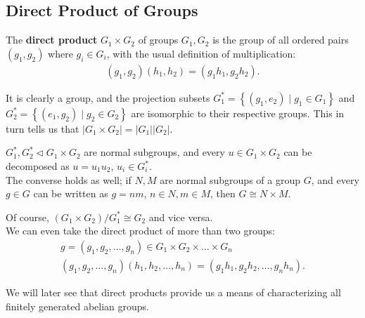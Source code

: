 \documentclass{memoir}
\begin{document}
\subsection{Direct Product of Groups}	
\begin{defn}
	The \textbf{direct product} \(G_1\times G_2\) of groups \(G_1,G_2\) is the group of all ordered pairs \((g_1,g_2)\) where \(g_i \in G_i\), with the usual definition of multiplication:
	\begin{align*}
		(g_1,g_2)(h_1,h_2) = (g_1h_1,g_2h_2).
	\end{align*}
\end{defn}
	It is clearly a group, and the projection subsets \(G_1^{*}= \left\{(g_1,e_2) \mid g_1 \in G_1 \right\} \) and \(G_2^{*}=\left\{(e_1,g_2) \mid g_2 \in G_2 \right\} \) are isomorphic to their respective groups. This in turn tells us that \(\left| G_1\times G_2 \right| = \left| G_1 \right| \left| G_2 \right| \).\\
	\begin{prop}
\(G_1^{*},G_2^{*} \triangleleft G_1\times G_2\) are normal subgroups, and every \(u \in G_1\times G_2\) can be decomposed as \(u = u_1u_2\), \(u_i \in G_i^{*}\).\\

The converse holds as well; if \(N,M\) are normal subgroups of a group \(G\), and every \(g \in G\) can be written as \(g = nm\), \(n \in N, m \in M\), then \(G \cong N\times M\).
	\end{prop}
Of course, \((G_1\times G_2) / G_1^{*} \cong G_2\) and vice versa.\\

We can even take the direct product of more than two groups:
\begin{align*}
	g = (g_1,g_2,\ldots,g_n) \in G_1\times G_2\times \ldots \times G_n\\
	(g_1,g_2,\ldots,g_n)(h_1,h_2,\ldots,h_n) = (g_1h_1,g_2h_2,\ldots,g_nh_n).
\end{align*}

We will later see that direct products provide us a means of characterizing all finitely generated abelian groups.
\end{document}
